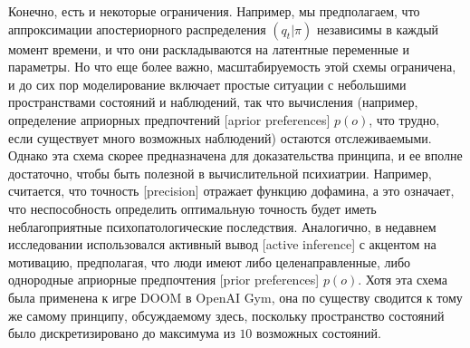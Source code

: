 \documentclass[twoside,leqno, 11pt]{article}
\begin{document}
	
	Конечно, есть и некоторые ограничения. Например, мы предполагаем, что аппроксимации апостериорного распределения $(q_t|\pi)$ независимы в каждый момент времени, и что они раскладываются на латентные переменные и параметры. Но что еще более важно, масштабируемость этой схемы ограничена, и до сих пор моделирование включает простые ситуации с небольшими пространствами состояний и наблюдений, так что вычисления (например, определение априорных предпочтений [aprior preferences] $p(o)$, что трудно, если существует много возможных наблюдений) остаются отслеживаемыми. Однако эта схема скорее предназначена для доказательства принципа, и ее вполне достаточно, чтобы быть полезной в вычислительной психиатрии. Например, считается, что точность [precision] отражает функцию дофамина, а это означает, что неспособность определить оптимальную точность будет иметь неблагоприятные психопатологические последствия. Аналогично, в недавнем исследовании использовался активный вывод [active inference] с акцентом на мотивацию, предполагая, что люди имеют либо целенаправленные, либо однородные априорные предпочтения [prior preferences] $p(o)$. Хотя эта схема была применена к игре DOOM в OpenAI Gym, она по существу сводится к тому же самому принципу, обсуждаемому здесь, поскольку пространство состояний было дискретизировано до максимума из $10$ возможных состояний.
	
\end{document}
